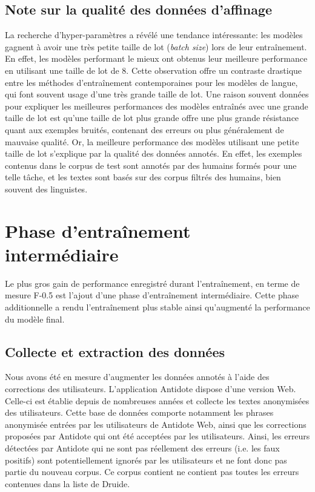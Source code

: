 \documentclass[12pt,twoside,maitrise]{dms}
\theoremstyle{definition}
\numberwithin{equation}{section}
\numberwithin{table}{chapter}
\numberwithin{figure}{chapter}
\begin{document}
\subsection{Note sur la qualité des données d'affinage}
La recherche d'hyper-paramètres a révélé une tendance intéressante:
les modèles gagnent à avoir une très petite taille de lot
(\textit{batch size}) lors de leur entraînement. En effet, les modèles
performant le mieux ont obtenus leur meilleure performance en
utilisant une taille de lot de 8. Cette observation offre un contraste
drastique entre les méthodes d'entraînement contemporaines pour les
modèles de langue, qui font souvent usage d'une très grande taille de
lot. Une raison souvent données pour expliquer les meilleures
performances des modèles entraînés avec une grande taille de lot est
qu'une taille de lot plus grande offre une plus grande résistance
quant aux exemples bruités, contenant des erreurs ou plus généralement
de mauvaise qualité. Or, la meilleure performance des modèles
utilisant une petite taille de lot s'explique par la qualité des
données annotés. En effet, les exemples contenus dans le corpus de
test sont annotés par des humains formés pour une telle tâche, et les
textes sont basés sur des corpus filtrés des humains, bien souvent des
linguistes.

\section{Phase d'entraînement intermédiaire}
Le plus gros gain de performance enregistré durant l'entraînement, en
terme de mesure F-0.5 est l'ajout d'une phase d'entraînement
intermédiaire. Cette phase additionnelle a rendu l'entraînement plus
stable ainsi qu'augmenté la performance du modèle final.

\subsection{Collecte et extraction des données}
Nous avons été en mesure d'augmenter les données annotés à l'aide des
corrections des utilisateurs. L'application Antidote dispose d'une version Web.
Celle-ci est établie depuis de nombreuses années et collecte les textes
anonymisées des utilisateurs. Cette base de données comporte notamment les
phrases anonymisée entrées par les utilisateurs de Antidote Web, ainsi que les
corrections proposées par Antidote qui ont été acceptées par les utilisateurs.
Ainsi, les erreurs détectées par Antidote qui ne sont pas réellement des
erreurs (i.e. les faux positifs) sont potentiellement ignorés par les
utilisateurs et ne font donc pas partie du nouveau corpus. Ce corpus contient
ne contient pas toutes les erreurs contenues dans la liste de Druide. \\
\end{document}
